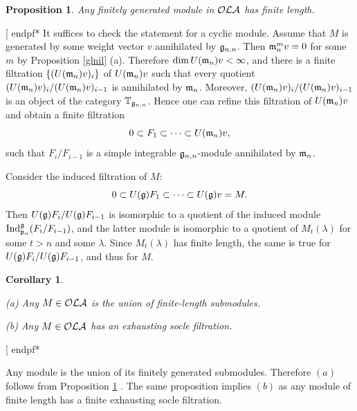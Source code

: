 \documentclass[12pt]{amsart}
\makeatletter
\def\mathbb{\Bbb}
\def\mathfrak{\frak}
\newenvironment{proof}{%
         \@ifnextchar[{%
                       \expandafter\let\expandafter\end@proof
                         \csname endpf*\endcsname
                         \my@proof
                      }{\let\end@proof\endpf\pf}%
        }{\end@proof}
\def\my@proof[#1]{\@nameuse{pf*}{#1}}
\def\mathcal{\cal}
\def\@putname#1#2#3#4{\def\@@ref{#3}\let\old@bf\bf
        \def\bf##1{\old@bf\if?\noexpand##1?{#4}\else##1\fi}%
        #1{#2}%
        \let\bf\old@bf}
\def\@putname#1#2#3#4{\def\@@ref{#3}\let\old@bf\bf    %
        \let\old@reset@font\reset@font                  %
        \def\bf##1{\old@bf\if?\noexpand##1?{#4}\else##1\fi}%
        \def\reset@font##1##2{\old@reset@font##1\if?\noexpand##2?{#4}\else##2\fi}#1{#2}%
        \let\bf\old@bf\let\reset@font\old@reset@font}
\let\my@ref=\ref
\def\ref#1{\@putname\my@ref{#1}{#1}{\tiny\rm\@@ref}}
\theoremstyle{plain} %
\numberwithin{equation}{section}
\theoremstyle{definition}
\theoremstyle{remark}
\theoremstyle{plain} %
\newtheorem{corollary}[definition]{Corollary}
\newtheorem{proposition}[definition]{Proposition}
\newcommand{\fg}{\mathfrak{g}}
\newcommand{\fp}{\mathfrak{p}}
\newcommand{\fm}{\mathfrak{m}}
\makeatother
\begin{document}
\begin{proposition}\label{fl} Any finitely generated module in $\mathcal{OLA}$ has finite length.
\end{proposition}
\begin{proof} It suffices to check the statement for a cyclic module. Assume that $M$ is generated by some weight vector $v$ annihilated by $\fg_{n,n}$.
Then $\fm_n^m v=0$ for some $m$ by
   Proposition \ref{glnil} (a). Therefore $\operatorname{dim}U(\fm_n)v<\infty$, and 
 there is a finite filtration
  $\{(U(\fm_n)v)_i\}$ of $U(\fm_n)v$ such that every quotient $(U(\fm_n)v)_i/(U(\fm_n)v)_{i-1}$ is annihilated by $\fm_n$. Moreover,  $(U(\fm_n)v)_i/(U(\fm_n)v)_{i-1}$ is an
  object of the category $\mathbb T_{\fg_{n,n}}$.
  Hence one can refine this filtration of $U(\fm_n)v$ and obtain a finite filtration
  $$0\subset F_1\subset\dots\subset U(\fm_n)v,$$
  such that $F_i/F_{i-1}$ is a simple integrable $\fg_{n,n}$-module annihilated by $\fm_n$.

 Consider the induced filtration of $M$:
  $$0\subset U(\fg)F_1\subset\dots\subset U(\fg)v=M.$$
  Then $U(\fg)F_i/U(\fg)F_{i-1}$ is isomorphic to a quotient of the induced module $\operatorname{Ind}^\fg_{\fp_n}(F_i/F_{i-1})$, and the latter module is
  isomorphic to a quotient of
  $M_t(\lambda)$ for some $t>n$ and some $\lambda$. Since $M_t(\lambda)$ has finite length, the same is true for $U(\fg)F_i/U(\fg)F_{i-1}$, and thus for $M$.
\end{proof}

\begin{corollary} 

\label{soc}

(a) Any $M\in\mathcal{OLA}$ is the union of finite-length submodules.

(b) Any $M\in\mathcal{OLA}$ has an exhausting socle filtration.

\end{corollary}


\begin{proof}
 Any module is the union of its finitely generated submodules. Therefore $(a)$ follows from Proposition \ref{fl}. The same proposition implies  $(b)$ as any module of finite length  has a finite exhausting socle filtration.

\end{proof}
\end{document}

